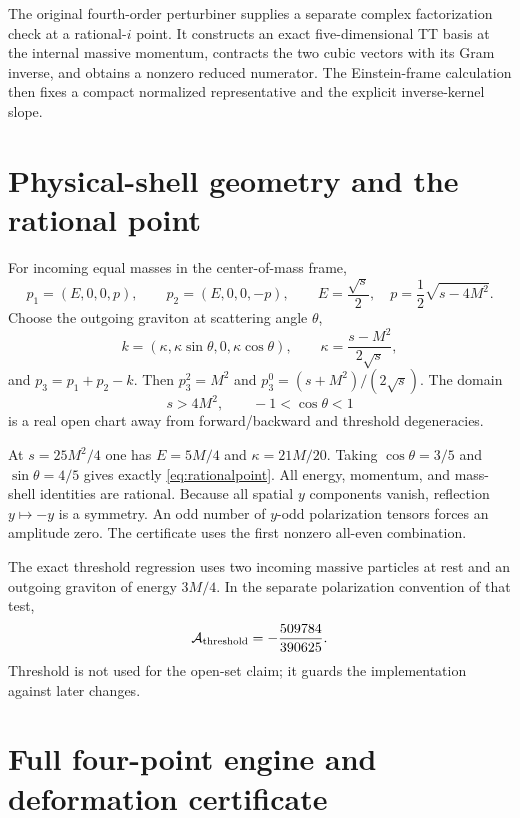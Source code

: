 \documentclass[11pt]{article}
\theoremstyle{definition}
\theoremstyle{remark}
\begin{document}
The original fourth-order perturbiner supplies a separate complex
factorization check at a rational-$i$ point.  It constructs an exact
five-dimensional TT basis at the internal massive momentum, contracts
the two cubic vectors with its Gram inverse, and obtains a nonzero
reduced numerator.  The Einstein-frame calculation then fixes a compact
normalized representative and the explicit inverse-kernel slope.

\section{Physical-shell geometry and the rational point}
\label{app:shell}

For incoming equal masses in the center-of-mass frame,
\begin{equation}
p_1=(E,0,0,p),\qquad p_2=(E,0,0,-p),
\qquad E=\frac{\sqrt s}{2},\quad
p=\frac12\sqrt{s-4M^2}.
\end{equation}
Choose the outgoing graviton at scattering angle $\theta$,
\begin{equation}
k=(\kappa,\kappa\sin\theta,0,\kappa\cos\theta),
\qquad
\kappa=\frac{s-M^2}{2\sqrt s},
\end{equation}
and $p_3=p_1+p_2-k$.  Then $p_3^2=M^2$ and
$p_3^0=(s+M^2)/(2\sqrt s)$.  The domain
\begin{equation}
s>4M^2,\qquad -1<\cos\theta<1
\end{equation}
is a real open chart away from forward/backward and threshold
degeneracies.

At $s=25M^2/4$ one has $E=5M/4$ and
$\kappa=21M/20$.  Taking $\cos\theta=3/5$ and
$\sin\theta=4/5$ gives exactly \eqref{eq:rationalpoint}.  All energy,
momentum, and mass-shell identities are rational.  Because all spatial
$y$ components vanish, reflection $y\mapsto-y$ is a symmetry.  An odd
number of $y$-odd polarization tensors forces an amplitude zero.  The
certificate uses the first nonzero all-even combination.

The exact threshold regression uses two incoming massive particles at
rest and an outgoing graviton of energy $3M/4$.  In the separate
polarization convention of that test,
\begin{equation}
\mathcal A_{\rm threshold}=-\frac{509784}{390625}.
\end{equation}
Threshold is not used for the open-set claim; it guards the implementation
against later changes.

\section{Full four-point engine and deformation certificate}
\label{app:fourpoint}
\end{document}
